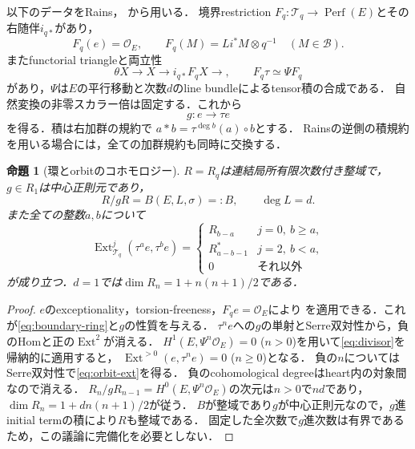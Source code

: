 \documentclass[11pt,a4paper]{ltjsarticle}
\newtheorem{proposition}[theorem]{命題}
\theoremstyle{definition}
\newcommand{\OO}{\mathcal O}
\newcommand{\BB}{\mathcal B}
\newcommand{\TT}{\mathcal T}
\newcommand{\Ext}{\operatorname{Ext}}
\newcommand{\Perf}{\operatorname{Perf}}
\begin{document}
以下のデータをRains\cite[Theorem~4.30, \S5]{RB}，
\cite[\S4, (4.4), (4.7), Proposition~5.1]{RF}から用いる．
境界restriction $F_q:\TT_q\to\Perf(E)$とその右随伴$i_{q*}$があり，
\begin{equation}\label{eq:restriction}
 F_q(e)=\OO_E,\qquad F_q(M)=Li^*M\otimes q^{-1}\quad(M\in\BB).
\end{equation}
またfunctorial triangleと両立性
\begin{equation}\label{eq:divisor}
 \theta X\longrightarrow X\longrightarrow i_{q*}F_qX\longrightarrow,
 \qquad F_q\tau\simeq\Psi F_q
\end{equation}
があり，$\Psi$は$E$の平行移動と次数$d$のline bundleによるtensor積の合成である．
自然変換の非零スカラー倍は固定する．これから
\[
 g:e\longrightarrow\tau e
\]
を得る．積は右加群の規約で
$a*b=\tau^{\deg b}(a)\circ b$とする．
Rainsの逆側の積規約を用いる場合には，全ての加群規約も同時に交換する．

\begin{proposition}[環とorbitのコホモロジー]\label{prop:ring-orbit}
$R=R_q$は連結局所有限次数付き整域で，$g\in R_1$は中心正則元であり，
\begin{equation}\label{eq:boundary-ring}
 R/gR=B(E,L,\sigma)=:B,\qquad\deg L=d.
\end{equation}
また全ての整数$a,b$について
\begin{equation}\label{eq:orbit-ext}
 \Ext^j_{\TT_q}(\tau^ae,\tau^be)=
 \begin{cases}
 R_{b-a}&j=0,\ b\geq a,\\
 R_{a-b-1}^*&j=2,\ b<a,\\
 0&\text{それ以外}
 \end{cases}
\end{equation}
が成り立つ．$d=1$では$\dim R_n=1+n(n+1)/2$である．
\end{proposition}
\begin{proof}
$e$のexceptionality，torsion-freeness，$F_qe=\OO_E$により
\cite[Proposition~5.1]{RF}を適用できる．これが\eqref{eq:boundary-ring}と$g$の性質を与える．
$\tau^n e$への$g$の単射とSerre双対性から，負のHomと正の$\Ext^2$が消える．
$H^1(E,\Psi^n\OO_E)=0$ ($n>0$)を用いて\eqref{eq:divisor}を帰納的に適用すると，
$\Ext^{>0}(e,\tau^ne)=0$ ($n\geq0$)となる．
負の$n$についてはSerre双対性で\eqref{eq:orbit-ext}を得る．
負のcohomological degreeはheart内の対象間なので消える．
$R_n/gR_{n-1}=H^0(E,\Psi^n\OO_E)$の次元は$n>0$で$nd$であり，
$\dim R_n=1+dn(n+1)/2$が従う．
$B$が整域であり$g$が中心正則元なので，$g$進initial termの積により$R$も整域である．
固定した全次数で$g$進次数は有界であるため，この議論に完備化を必要としない．
\end{proof}
\end{document}
